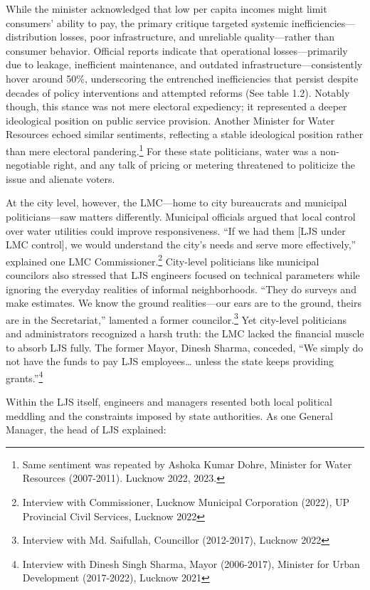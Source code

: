 While the minister acknowledged that low per capita incomes might limit consumers’ ability to pay, the primary critique targeted systemic inefficiencies—distribution losses, poor infrastructure, and unreliable quality—rather than consumer behavior. Official reports indicate that operational losses—primarily due to leakage, inefficient maintenance, and outdated infrastructure—consistently hover around 50\%, underscoring the entrenched inefficiencies that persist despite decades of policy interventions and attempted reforms (See table 1.2). Notably though, this stance was not mere electoral expediency; it represented a deeper ideological position on public service provision. Another Minister for Water Resources echoed similar sentiments, reflecting a stable ideological position rather than mere electoral pandering.\footnote{Same sentiment was repeated by Ashoka Kumar Dohre, Minister for Water Resources (2007-2011). Lucknow 2022, 2023.} For these state politicians, water was a non-negotiable right, and any talk of pricing or metering threatened to politicize the issue and alienate voters.

At the city level, however, the LMC—home to city bureaucrats and municipal politicians—saw matters differently. Municipal officials argued that local control over water utilities could improve responsiveness. “If we had them [LJS under LMC control], we would understand the city’s needs and serve more effectively,” explained one LMC Commissioner.\footnote{Interview with Commissioner, Lucknow Municipal Corporation (2022), UP Provincial Civil Services, Lucknow 2022} City-level politicians like municipal councilors also stressed that LJS engineers focused on technical parameters while ignoring the everyday realities of informal neighborhoods. “They do surveys and make estimates. We know the ground realities—our ears are to the ground, theirs are in the Secretariat,” lamented a former councilor.\footnote{Interview with Md. Saifullah, Councillor (2012-2017), Lucknow 2022} Yet city-level politicians and administrators recognized a harsh truth: the LMC lacked the financial muscle to absorb LJS fully. The former Mayor, Dinesh Sharma, conceded, “We simply do not have the funds to pay LJS employees… unless the state keeps providing grants.”\footnote{Interview with Dinesh Singh Sharma, Mayor (2006-2017), Minister for Urban Development (2017-2022), Lucknow 2021} 

Within the LJS itself, engineers and managers resented both local political meddling and the constraints imposed by state authorities. As one General Manager, the head of LJS explained:

